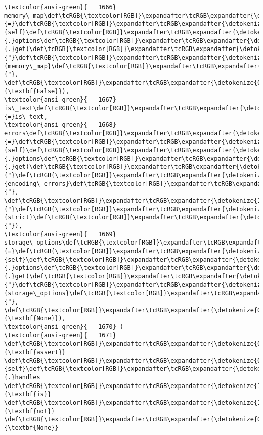 \documentclass[11pt]{article}
\begin{document}
\begin{Verbatim}[commandchars=\\\{\}, frame=single, framerule=2mm, rulecolor=\color{outerrorbackground}]
\textcolor{ansi-green}{   1666}     memory\_map\def\tcRGB{\textcolor[RGB]}\expandafter\tcRGB\expandafter{\detokenize{98,98,98}}{=}\def\tcRGB{\textcolor[RGB]}\expandafter\tcRGB\expandafter{\detokenize{0,135,0}}{self}\def\tcRGB{\textcolor[RGB]}\expandafter\tcRGB\expandafter{\detokenize{98,98,98}}{.}options\def\tcRGB{\textcolor[RGB]}\expandafter\tcRGB\expandafter{\detokenize{98,98,98}}{.}get(\def\tcRGB{\textcolor[RGB]}\expandafter\tcRGB\expandafter{\detokenize{175,0,0}}{"}\def\tcRGB{\textcolor[RGB]}\expandafter\tcRGB\expandafter{\detokenize{175,0,0}}{memory\_map}\def\tcRGB{\textcolor[RGB]}\expandafter\tcRGB\expandafter{\detokenize{175,0,0}}{"}, \def\tcRGB{\textcolor[RGB]}\expandafter\tcRGB\expandafter{\detokenize{0,135,0}}{\textbf{False}}),
\textcolor{ansi-green}{   1667}     is\_text\def\tcRGB{\textcolor[RGB]}\expandafter\tcRGB\expandafter{\detokenize{98,98,98}}{=}is\_text,
\textcolor{ansi-green}{   1668}     errors\def\tcRGB{\textcolor[RGB]}\expandafter\tcRGB\expandafter{\detokenize{98,98,98}}{=}\def\tcRGB{\textcolor[RGB]}\expandafter\tcRGB\expandafter{\detokenize{0,135,0}}{self}\def\tcRGB{\textcolor[RGB]}\expandafter\tcRGB\expandafter{\detokenize{98,98,98}}{.}options\def\tcRGB{\textcolor[RGB]}\expandafter\tcRGB\expandafter{\detokenize{98,98,98}}{.}get(\def\tcRGB{\textcolor[RGB]}\expandafter\tcRGB\expandafter{\detokenize{175,0,0}}{"}\def\tcRGB{\textcolor[RGB]}\expandafter\tcRGB\expandafter{\detokenize{175,0,0}}{encoding\_errors}\def\tcRGB{\textcolor[RGB]}\expandafter\tcRGB\expandafter{\detokenize{175,0,0}}{"}, \def\tcRGB{\textcolor[RGB]}\expandafter\tcRGB\expandafter{\detokenize{175,0,0}}{"}\def\tcRGB{\textcolor[RGB]}\expandafter\tcRGB\expandafter{\detokenize{175,0,0}}{strict}\def\tcRGB{\textcolor[RGB]}\expandafter\tcRGB\expandafter{\detokenize{175,0,0}}{"}),
\textcolor{ansi-green}{   1669}     storage\_options\def\tcRGB{\textcolor[RGB]}\expandafter\tcRGB\expandafter{\detokenize{98,98,98}}{=}\def\tcRGB{\textcolor[RGB]}\expandafter\tcRGB\expandafter{\detokenize{0,135,0}}{self}\def\tcRGB{\textcolor[RGB]}\expandafter\tcRGB\expandafter{\detokenize{98,98,98}}{.}options\def\tcRGB{\textcolor[RGB]}\expandafter\tcRGB\expandafter{\detokenize{98,98,98}}{.}get(\def\tcRGB{\textcolor[RGB]}\expandafter\tcRGB\expandafter{\detokenize{175,0,0}}{"}\def\tcRGB{\textcolor[RGB]}\expandafter\tcRGB\expandafter{\detokenize{175,0,0}}{storage\_options}\def\tcRGB{\textcolor[RGB]}\expandafter\tcRGB\expandafter{\detokenize{175,0,0}}{"}, \def\tcRGB{\textcolor[RGB]}\expandafter\tcRGB\expandafter{\detokenize{0,135,0}}{\textbf{None}}),
\textcolor{ansi-green}{   1670} )
\textcolor{ansi-green}{   1671} \def\tcRGB{\textcolor[RGB]}\expandafter\tcRGB\expandafter{\detokenize{0,135,0}}{\textbf{assert}} \def\tcRGB{\textcolor[RGB]}\expandafter\tcRGB\expandafter{\detokenize{0,135,0}}{self}\def\tcRGB{\textcolor[RGB]}\expandafter\tcRGB\expandafter{\detokenize{98,98,98}}{.}handles \def\tcRGB{\textcolor[RGB]}\expandafter\tcRGB\expandafter{\detokenize{175,0,255}}{\textbf{is}} \def\tcRGB{\textcolor[RGB]}\expandafter\tcRGB\expandafter{\detokenize{175,0,255}}{\textbf{not}} \def\tcRGB{\textcolor[RGB]}\expandafter\tcRGB\expandafter{\detokenize{0,135,0}}{\textbf{None}}

\end{Verbatim}
\end{document}
